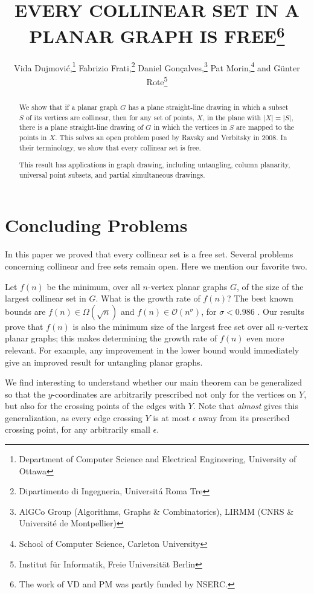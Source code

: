 \documentclass{patmorin}
\title{\MakeUppercase{Every Collinear Set in a Planar Graph Is Free}\thanks{%
    The work of VD and PM was partly funded by NSERC.}}
\author{Vida Dujmovi\'c,\thanks{Department of Computer Science and Electrical Engineering, University of Ottawa}\quad
        Fabrizio Frati,\thanks{Dipartimento di Ingegneria, Universit\'a Roma Tre}\quad 
        Daniel Gon\c{c}alves,\thanks{AlGCo Group (Algorithms, Graphs \& Combinatorics), LIRMM (CNRS \& Universit\'{e} de Montpellier)}\quad
        Pat Morin,\thanks{School of Computer Science, Carleton University}\quad 
        and G\"unter Rote\thanks{Institut f\"ur Informatik, Freie Universit\"at Berlin}}
\begin{document}
\maketitle


\begin{abstract}
  We show that if a planar graph $G$ has a plane straight-line drawing
   in which a subset $S$ of its vertices are collinear, then for any
   set of points, $X$, in the plane with $|X|=|S|$, there is a plane
  straight-line drawing of $G$ in which the vertices in $S$ are
  mapped to the points in $X$.  This solves an open problem posed by
  Ravsky and Verbitsky in 2008.  In their terminology, we show that
  every collinear set is free.
  
  This result has applications in graph drawing, including untangling,
  column planarity, universal point subsets, and partial simultaneous
  drawings.
\end{abstract}






\section{Concluding Problems}

In this paper we proved that every collinear set is a free set. Several problems concerning collinear and free sets remain open. Here we mention our favorite two.

Let $f(n)$ be the minimum, over all $n$-vertex planar graphs $G$, of the size of the largest collinear set in $G$. What is the growth rate of $f(n)$? The best known bounds are $f(n)\in\Omega(\sqrt{n})$ and $f(n)\in \mathcal{O}(n^\sigma)$, for $\sigma < 0.986$ \cite{bose.dujmovic.ea:polynomial,ravsky.verbitsky:on}. Our results prove that $f(n)$ is also the minimum size of the largest free set over all $n$-vertex planar graphs; this makes determining the growth rate of $f(n)$ even more relevant. For example, any improvement in the lower bound would immediately give an improved result for untangling planar graphs.
%

We find interesting to understand whether our main theorem can be generalized so that the $y$-coordinates are arbitrarily prescribed not only for the vertices on $Y$, but also for the crossing points of the edges with $Y$. Note that  {\em almost} gives this generalization, as every edge crossing $Y$ is at most $\epsilon$ away from its prescribed crossing point, for any arbitrarily small $\epsilon$. 
\end{document}
